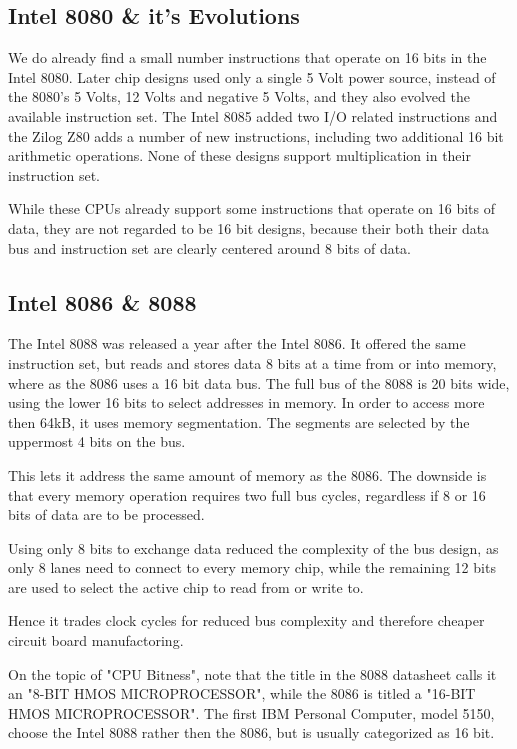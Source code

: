 \documentclass[twoside,twocolumn]{article}
\begin{document}
\subsection{Intel 8080 \& it's Evolutions}

We do already find a small number instructions that operate on 16 bits in the Intel 8080.
Later chip designs used only a single 5 Volt power source, instead of the 8080's 5 Volts,
12 Volts and negative 5 Volts, and they also evolved the available instruction set. The
Intel 8085 added two I/O related instructions and the Zilog Z80 adds a number of new
instructions, including two additional 16 bit arithmetic operations. None of these designs
support multiplication in their instruction set. \cite{softwaresolutions}

While these CPUs already support some instructions that operate on 16 bits of data, they
are not regarded to be 16 bit designs, because their both their data bus and
instruction set are clearly centered around 8 bits of data.

\subsection{Intel 8086 \& 8088}

The Intel 8088 was released a year after the Intel 8086. It offered the same instruction
set, but reads and stores data 8 bits at a time from or into memory, where as the 8086
uses a 16 bit data bus. The full bus of the 8088 is 20 bits wide, using the lower 16 bits
to select addresses in memory. In order to access more then 64kB, it uses memory
segmentation. The segments are selected by the uppermost 4 bits on the bus.

This lets it address the same amount of memory as the 8086. The downside is that every
memory operation requires two full bus cycles, regardless if 8 or 16 bits of data are
to be processed.

Using only 8 bits to exchange data reduced the complexity of the bus design, as only 8
lanes need to connect to every memory chip, while the remaining 12 bits are used to
select the active chip to read from or write to.

Hence it trades clock cycles for reduced bus complexity and therefore cheaper circuit
board manufactoring.

On the topic of "CPU Bitness", note that the title in the 8088 datasheet calls it an
"8-BIT HMOS MICROPROCESSOR"\cite{intel8088}, while the 8086 is titled a "16-BIT HMOS
MICROPROCESSOR"\cite{intel8086}. The first IBM Personal Computer, model 5150, choose
the Intel 8088 rather then the 8086, but is usually categorized as 16 bit.
\end{document}
